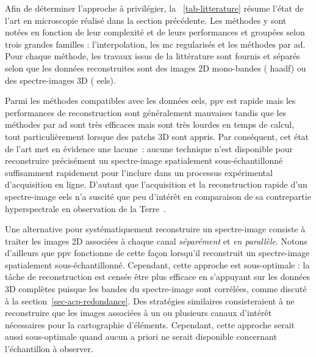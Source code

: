 Afin de déterminer l'approche à privilégier, la \tabname~\ref{tab-litterature} résume l'état de l'art en microscopie réalisé dans la section précédente. Les méthodes y sont notées en fonction de leur complexité et de leurs performances et groupées selon trois grandes familles : l'interpolation, les \gls{mc} regularisés et les méthodes par \gls{ad}. Pour chaque méthode, les travaux issus de la littérature sont fournis et séparés selon que les données reconstruites sont des images 2D mono-bandes (\eg{} \gls{haadf}) ou des spectre-images 3D (\eg{} \gls{eels}).

Parmi les méthodes compatibles avec les données \gls{eels}, \gls{ppv} est rapide mais les performances de reconstruction sont généralement mauvaises tandis que les méthodes par \gls{ad} sont très efficaces mais sont très lourdes en temps de calcul, tout particulièrement lorsque des patchs 3D sont appris. Par conséquent, cet état de l'art met en évidence une lacune : aucune technique n'est disponible pour reconstruire précisément un spectre-image spatialement sous-échantillonné suffisamment rapidement pour l'inclure dans un processus expérimental d'acquisition en ligne. D'autant que l'acquisition et la reconstruction rapide d'un spectre-image \gls{eels} n'a suscité que peu d'intérêt en comparaison de sa contrepartie hyperspectrale en observation de la Terre~\cite{zhang_hyperspectral_2014, chayes_pre_processing_2017, golbabaee_hyperspectral_2012, chen_inpainting_2012}.

Une alternative pour systématiquement reconstruire un spectre-image consiste à traiter les images 2D associées à chaque canal \emph{séparément} et \emph{en parallèle}. Notons d'ailleurs que \gls{ppv} fonctionne de cette façon lorsqu'il reconstruit un spectre-image spatialement sous-échantillonné. Cependant, cette approche est sous-optimale : la tâche de reconstruction est censée être plus efficace en s'appuyant sur les données 3D complètes puisque les bandes du spectre-image sont corrélées, comme discuté à la section~\ref{sec-acp-redondance}. Des stratégies similaires consisteraient à ne reconstruire que les images associées à un ou plusieurs canaux d'intérêt nécessaires pour la cartographie d'éléments. Cependant, cette approche serait aussi sous-optimale quand aucun a priori ne serait disponible concernant l'échantillon à observer.

